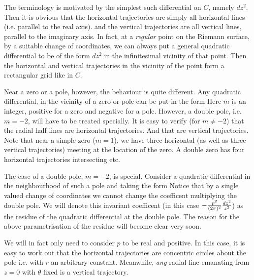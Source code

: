 The terminology is motivated by the simplest such differential on $C$, namely
$dz^2$. Then it is obvious that the 
horizontal trajectories are simply all horizontal lines (i.e. parallel to 
the real axis). and the vertical trajectories are all vertical lines, 
parallel to the imaginary axis. In fact, at a {\it regular} point 
on the Riemann
surface, by a suitable change of coordinates, we can always put a general 
quadratic differential to be of the form $dz^2$ in the infinitesimal 
vicinity of that point. Then the horizontal and vertical trajectories in 
the vicinity of the point form a rectangular grid like in $C$. 

Near a zero or a pole, however, the behaviour is quite different. 
Any quadratic differential,
in the vicinity of a zero or pole can be put in the form 
\eqn{}
Here $m$ is an integer, positive for a zero and negative 
for a pole. However, a double pole, i.e. $m=-2$, will have to be
treated specially. 
It is easy to verify (for $m\neq -2$) that the radial half lines
\eqn{}
are horizontal trajectories. 
And that
\eqn{}
are vertical trajectories.
Note that near a simple zero ($m=1$), we have three horizontal (as well
as three vertical trajectories) meeting at the location of the zero. 
A double zero has four horizontal trajectories intersecting etc.   

The case of a double pole, $m=-2$, is special. Consider a quadratic 
differential 
in the neighbourhood of such a pole and taking the form 
\eqn{}
Notice that by a single valued 
change of coordinates we cannot change the 
coefficent multiplying the double pole. We will denote this invariant 
coefficent (in this case $-{p^2\over (2\pi)^2}{dz^2\over z^2}$)
as the residue of the quadratic differential at the double pole. 
The reason for the above parametrisation of the residue will become 
clear very soon. 

We will in fact only need to consider $p$ to be real and positive. 
In this case,
it is easy to work out 
that the horizontal trajectories are concentric circles about the pole
i.e. 
\eqn{}
with $r$ an arbitrary constant. Meanwhile, {\it any} radial line
emanating from $z=0$ 
\eqn{}
with $\theta$ fixed 
is a vertical trajectory.   

